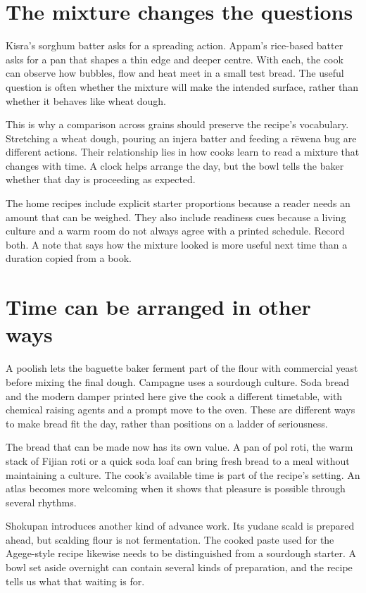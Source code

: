 \section{The mixture changes the questions}
Kisra's sorghum batter asks for a spreading action. Appam's rice-based batter asks for a pan that shapes a thin edge and deeper centre. With each, the cook can observe how bubbles, flow and heat meet in a small test bread. The useful question is often whether the mixture will make the intended surface, rather than whether it behaves like wheat dough.\citep{moggakisra,familiarappam06}

This is why a comparison across grains should preserve the recipe's vocabulary. Stretching a wheat dough, pouring an injera batter and feeding a rēwena bug are different actions. Their relationship lies in how cooks learn to read a mixture that changes with time. A clock helps arrange the day, but the bowl tells the baker whether that day is proceeding as expected.

The home recipes include explicit starter proportions because a reader needs an amount that can be weighed. They also include readiness cues because a living culture and a warm room do not always agree with a printed schedule. Record both. A note that says how the mixture looked is more useful next time than a duration copied from a book.

\section{Time can be arranged in other ways}
A poolish lets the baguette baker ferment part of the flour with commercial yeast before mixing the final dough. Campagne uses a sourdough culture. Soda bread and the modern damper printed here give the cook a different timetable, with chemical raising agents and a prompt move to the oven. These are different ways to make bread fit the day, rather than positions on a ladder of seriousness.\citep{baguetterecipe,campagnerecipe,samdamper09}

The bread that can be made now has its own value. A pan of pol roti, the warm stack of Fijian roti or a quick soda loaf can bring fresh bread to a meal without maintaining a culture. The cook's available time is part of the recipe's setting. An atlas becomes more welcoming when it shows that pleasure is possible through several rhythms.

Shokupan introduces another kind of advance work. Its yudane scald is prepared ahead, but scalding flour is not fermentation. The cooked paste used for the Agege-style recipe likewise needs to be distinguished from a sourdough starter. A bowl set aside overnight can contain several kinds of preparation, and the recipe tells us what that waiting is for.\citep{urashokupan07,woodardagege}

